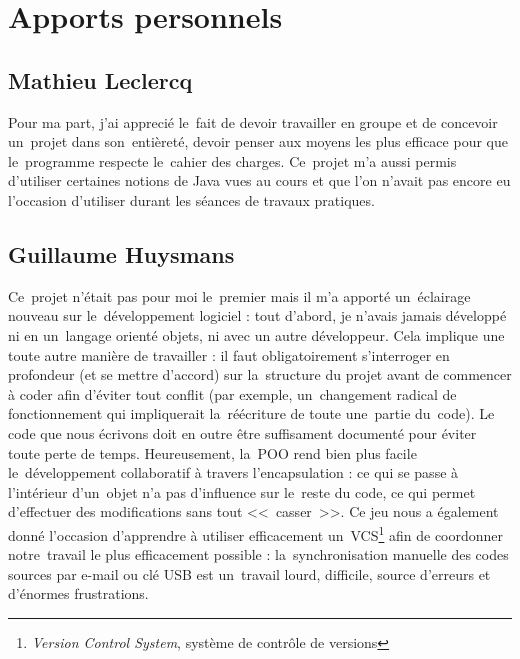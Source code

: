 \section{Apports personnels}

\subsection{Mathieu Leclercq}
Pour ma part, j'ai apprecié le~fait de devoir travailler en groupe et de concevoir un~projet dans son~entièreté,
devoir penser aux moyens les plus efficace pour que le~programme respecte le~cahier des charges. 
Ce~projet m'a aussi permis d'utiliser certaines notions de Java vues au cours et que l'on n'avait pas encore eu 
l'occasion d'utiliser durant les séances de travaux pratiques.   

\subsection{Guillaume Huysmans}
Ce~projet n'était pas pour moi le~premier mais il m'a apporté un~éclairage nouveau sur le~développement logiciel : 
tout d'abord, je n'avais jamais développé ni en un~langage orienté objets, ni avec un autre développeur. 
Cela implique une toute autre manière de travailler : il faut obligatoirement s'interroger en profondeur (et se mettre d'accord) 
sur la~structure du projet avant de commencer à coder afin d'éviter tout conflit (par exemple, un~changement radical 
de fonctionnement qui impliquerait la~réécriture de toute une~partie du~code). 
Le code que nous écrivons doit en outre être suffisament documenté pour éviter toute perte de temps.
Heureusement, la~POO rend bien plus facile le~développement collaboratif à travers l'encapsulation : ce qui se passe à l'intérieur 
d'un~objet n'a pas d'influence sur le~reste du code, ce qui permet d'effectuer des modifications sans tout <<~casser~>>. 
Ce jeu nous a également donné l'occasion d'apprendre à utiliser efficacement 
un~VCS\footnote{\emph{Version Control System}, système de contrôle de versions} 
afin de coordonner notre~travail le plus efficacement possible : la~synchronisation manuelle des codes sources par e-mail ou 
clé USB est un~travail lourd, difficile, source d'erreurs et d'énormes frustrations.